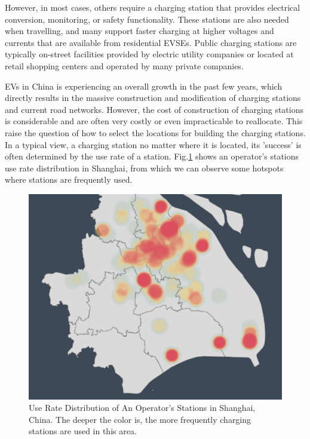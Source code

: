 \documentclass[runningheads]{llncs}
\begin{document}
However, in most cases, others require a charging station that provides electrical conversion, monitoring, or safety functionality. These stations are also needed when travelling, and many support faster charging at higher voltages and currents that are available from residential EVSEs. Public charging stations are typically on-street facilities provided by electric utility companies or located at retail shopping centers and operated by many private companies.


EVs in China is experiencing an overall growth in the past few years, which directly results in the massive construction and modification of charging stations and current road networks.  However, the cost of construction of charging stations is considerable and are often very costly or even impracticable to reallocate. This raise the question of how to select the locations for building the charging stations. In a typical view, a charging station no matter where it is located, its 'success' is often determined by the use rate of a station. Fig.\ref{fig1} shows an operator's stations use rate distribution in Shanghai, from which we can observe some hotspots where stations are frequently used.

\begin{figure}[!htp]
	\includegraphics[width=\columnwidth]{./figures/rate.pdf}
	\centering
	\caption{Use Rate Distribution of An Operator's Stations in Shanghai, China. The deeper the color is, the more frequently charging stations are used in this area.}
	\label{fig1}
\end{figure}  
\end{document}
